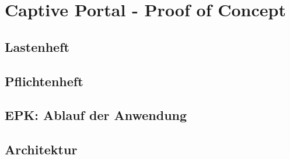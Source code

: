 \section{Captive Portal - Proof of Concept}
\label{section:realisation:captive_portal}
\subsection{Lastenheft}

\subsection{Pflichtenheft}

\subsection{EPK: Ablauf der Anwendung}

\subsection{Architektur}
